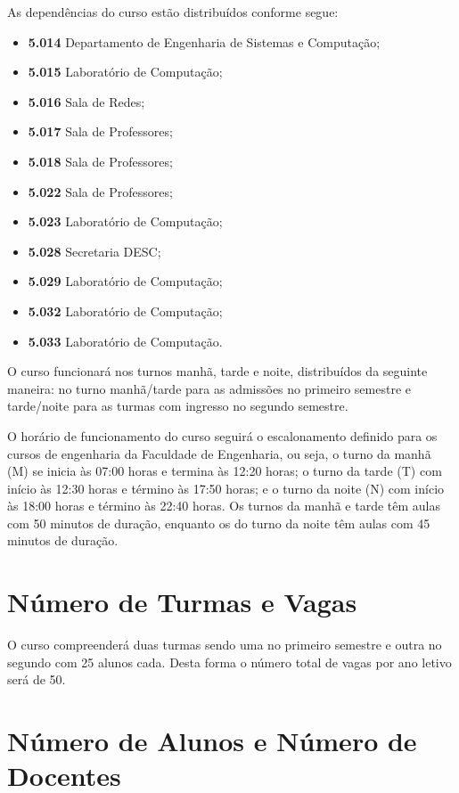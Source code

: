 As dependências do curso estão distribuídos conforme segue:
\begin{itemize}
    \item \textbf{5.014} Departamento de Engenharia de Sistemas e Computação;
    \item \textbf{5.015} Laboratório de Computação;
    \item \textbf{5.016} Sala de Redes;
    \item \textbf{5.017} Sala de Professores;
    \item \textbf{5.018} Sala de Professores;
    \item \textbf{5.022} Sala de Professores;
    \item \textbf{5.023} Laboratório de Computação;
    \item \textbf{5.028} Secretaria DESC;
    \item \textbf{5.029} Laboratório de Computação;
    \item \textbf{5.032} Laboratório de Computação;
    \item \textbf{5.033} Laboratório de Computação.
\end{itemize}

O curso funcionará nos turnos manhã, tarde e noite, distribuídos da seguinte maneira: no turno manhã/tarde para as admissões no primeiro semestre e tarde/noite para as turmas com ingresso no segundo semestre.  

O horário de funcionamento do curso seguirá o escalonamento definido para os cursos de engenharia da Faculdade de Engenharia, ou seja, o turno da manhã (M) se inicia às 07:00 horas e termina às 12:20 horas; o turno da tarde (T) com início às 12:30 horas e término às 17:50 horas; e o turno da noite (N) com início às 18:00 horas e término às 22:40 horas. Os turnos da manhã e tarde têm aulas com 50 minutos de duração, enquanto os do turno da noite têm aulas com 45 minutos de duração.  

\section{Número de Turmas e Vagas}

O curso compreenderá duas turmas sendo uma no primeiro semestre e outra no segundo com 25 alunos cada. Desta forma o número total de vagas por ano letivo será de 50.

\section{Número de Alunos e Número de Docentes}

